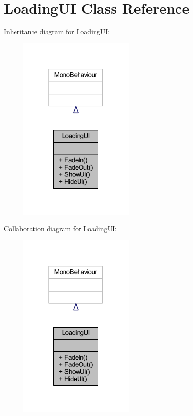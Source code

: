 \hypertarget{class_loading_u_i}{}\section{Loading\+UI Class Reference}
\label{class_loading_u_i}


Inheritance diagram for Loading\+UI\+:\nopagebreak
\begin{figure}[H]
\begin{center}
\leavevmode
\includegraphics[width=163pt]{class_loading_u_i__inherit__graph}
\end{center}
\end{figure}


Collaboration diagram for Loading\+UI\+:\nopagebreak
\begin{figure}[H]
\begin{center}
\leavevmode
\includegraphics[width=163pt]{class_loading_u_i__coll__graph}
\end{center}
\end{figure}
